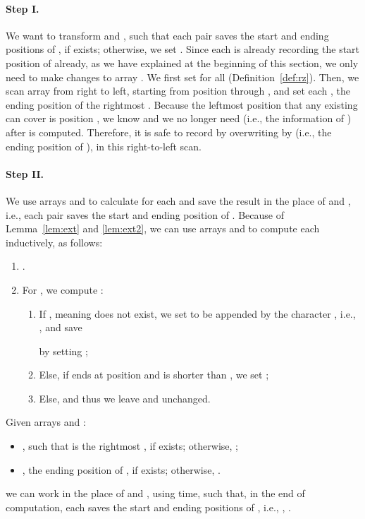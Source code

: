 \documentclass[11pt]{llncs}
\begin{document}
\paragraph{Step I.} We want to transform  and , such that each
 pair saves the start and ending positions of ,
if  exists; otherwise, we set .  Since each  is already recording the start
position of  already, as we have explained at the beginning
of this section, we only need to make changes to array .  We first
set  for all  (Definition~\ref{def:rz}). Then, we
scan array  from right to left, starting from position  through
, and set each , the ending position of the
rightmost . Because the leftmost position that any existing
 can cover is position , we know  and we no
longer need  (i.e., the information of ) after
 is computed. Therefore, it is safe to record  by
overwriting  by  (i.e., the ending position of
), in this right-to-left scan.


\paragraph{Step II.} 
We use arrays  and  to calculate  for each 
and save the result in the place of  and , i.e., each
 pair saves the start and ending position of .
Because of Lemma~\ref{lem:ext} and \ref{lem:ext2}, we can use arrays
 and  to compute each  inductively, as follows: 
\begin{enumerate}
\item 
. 
\item 
For , we compute : 
\begin{enumerate}
\item 
If , meaning 
does not exist, we set  to be  appended by the
character , i.e., , and save 

by setting ; 
\item Else, if  ends at position  and 
 is shorter 
than , 
we set ; 
\item Else,  and thus we leave 
  and  unchanged.
\end{enumerate}
\end{enumerate}



\begin{lemma}
\label{lem:sus}  
Given arrays  and :
\begin{itemize}
\item 
, such that  is the
rightmost , if  exists; 
otherwise, ; 
\item , the ending position of , if
 exists; otherwise, . 
\end{itemize}
we can work in the place of  and , using  time, 
such that, in the end of
computation, each  saves the start and ending
positions of , i.e., 
, .  
\end{lemma}
\end{document}
